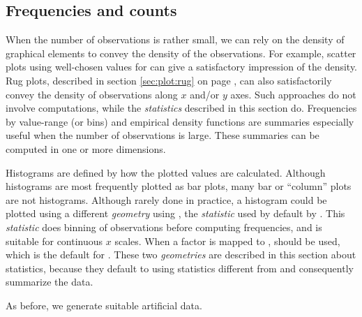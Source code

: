 \documentclass[krantz2]{krantz}\usepackage{knitr}
\begin{document}

\subsection{Frequencies and counts}\label{sec:histogram}\label{sec:plot:histogram}

When the number of observations is rather small, we can rely on the density of graphical elements to convey the density of the observations. For example, scatter plots using well-chosen values for  can give a satisfactory impression of the density. Rug plots, described in section \ref{sec:plot:rug} on page \pageref{sec:plot:rug}, can also satisfactorily convey the density of observations along $x$ and/or $y$ axes. Such approaches do not involve computations, while the \emph{statistics} described in this section do. Frequencies by value-range (or bins) and empirical density functions are summaries especially useful when the number of observations is large. These summaries can be computed in one or more dimensions.

Histograms are defined by how the plotted values are calculated. Although histograms are most frequently plotted as bar plots, many bar or ``column'' plots are not histograms. Although rarely done in practice, a histogram could be plotted using a different \emph{geometry} using , the \emph{statistic} used by default by . This \emph{statistic} does binning of observations before computing frequencies, and is suitable for continuous $x$ scales. When a factor is mapped to ,  should be used, which is the default  for . These two \emph{geometries} are described in this section about statistics, because they default to using statistics different from  and consequently summarize the data.

As before, we generate suitable artificial data.

\begin{knitrout}\footnotesize
{}\color{fgcolor}\begin{kframe}
\begin{alltt}
\hlstd{(}\hlstd{)}
 \hlkwb{<-}
\hlstd{(} \hlstd{=} \hlstd{(}\hlstd{),}
 \hlstd{=} \hlstd{(}\hlstd{(}\hlstd{,} \hlopt{-}\hlstd{,} \hlstd{),} \hlstd{(}\hlstd{,} \hlstd{,} \hlstd{)),}
 \hlstd{=} \hlstd{(}\hlstd{(}\hlstd{(}\hlstd{,} \hlstd{),} \hlstd{(}\hlstd{,} \hlstd{))) )}
\end{alltt}
\end{kframe}
\end{knitrout}
\end{document}

